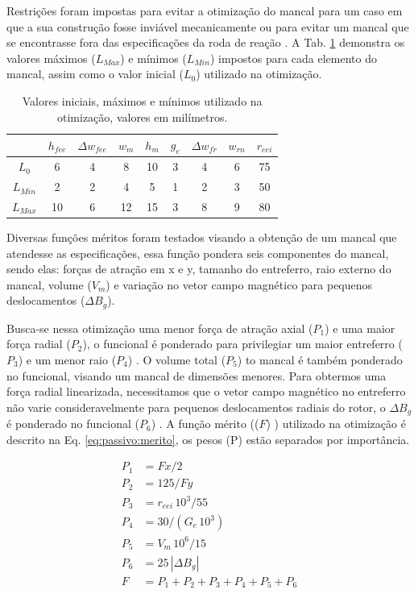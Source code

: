 Restrições foram impostas para evitar a otimização do mancal para um caso em que a sua construção fosse inviável mecanicamente ou para evitar um mancal que se encontrasse fora das especificações da roda de reação . A Tab. \ref{tab:passivo:restrições} demonstra os valores máximos ($L_{Max}$) e mínimos ($L_{Min}$) impostos para cada elemento do mancal, assim como o valor inicial ($L_0$) utilizado na otimização.


\begin{table}[ht!]
	\centering
	\begin{tabular}{c c c c c c c c c}
	& $h_{fee}$ &$\Delta w_{fee}$ & $w_m$ & $h_m$  & $g_e$ & $\Delta w_{fr}$ & $w_{rn}$ & $r_{eei}$ \\ \hline \hline

	$L_{0}$ 	&  6 &   4 &    8 &    10 &   3 &  4 &   6 &    75 \\
	$L_{Min}$ &  2    &  2   &  4  &   5&    1  & 2  &  3&    50\\			
	$L_{Max}$ &  10 &  6 &  12  &   15  &  3  &  8  &   9   &   80		
	\end{tabular} 
	\caption{Valores iniciais, máximos e mínimos utilizado na otimização, valores em milímetros.}
	\label{tab:passivo:restrições} 
\end{table}


Diversas funções méritos foram testados visando a obtenção de um mancal que atendesse as especificações, essa função pondera seis componentes do mancal, sendo elas: forças de atração em x e y, tamanho do entreferro, raio externo do mancal,  volume ($V_m$) e variação no vetor campo magnético para pequenos deslocamentos ($\Delta B_{g}$).

Busca-se nessa otimização uma menor força de atração axial ($P_1$) e uma maior força radial ($P_2$), o funcional é ponderado para privilegiar um maior entreferro ($P_3$) e um menor raio ($P_4$) . O volume total ($P_5$) to mancal é também ponderado no funcional, visando um mancal de dimensões menores. Para obtermos uma força radial linearizada, necessitamos que o vetor campo magnético no entreferro não varie consideravelmente para pequenos deslocamentos radiais do rotor, o $\Delta B_{g}$ é ponderado no funcional ($P_6$) . A função mérito (($F$) ) utilizado na otimização é descrito na Eq. \ref{eq:passivo:merito},  os pesos (P) estão separados por importância.

\begin{align}
  P_1 &= Fx/2 				\\ 
  P_2 &= 125/Fy		\\        
  P_3 &= r_{eei}\, 10^3/55 \\     
  P_4&= 30/(G_e \,  10^3) \\    
  P_5 &= V_m\, 10^6/15 \\        
  P_6 &= 25 \,  |{\Delta B_{g}}|\\   
  F &= P_1 + P_2 + P_3 + P_4 + P_5 + P_6   \label{eq:passivo:merito}
\end{align}

